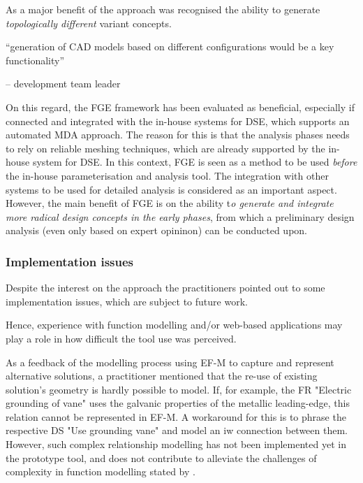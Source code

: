 \documentclass[preprints,article,accept,moreauthors,pdftex]{Definitions/mdpi}
\begin{document}
As a major benefit of the approach was recognised the ability to generate \textit{topologically different} variant concepts.

\begin{center}
    “generation of CAD models based on different configurations would be a key functionality” 
\end{center}
\begin{flushright}
    -- development team leader
\end{flushright}

On this regard, the \ac{FGE} framework has been evaluated as beneficial, especially if connected and integrated with the in-house systems for DSE, which supports an automated \ac{MDA} approach.
The reason for this is that the analysis phases needs to rely on reliable meshing techniques, which are already supported by the in-house system for DSE.
In this context, FGE is seen as a method to be used \textit{before} the in-house parameterisation and analysis tool.
The integration with other systems to be used for detailed analysis is considered as an important aspect.
However, the main benefit of FGE is on the ability t\textit{o generate and integrate more radical design concepts in the early phases}, from which a preliminary design analysis (even only based on expert opininon) can be conducted upon. 


\subsubsection{Implementation issues }

Despite the interest on the approach the practitioners pointed out to some implementation issues, which are subject to future work.

Hence, experience with function modelling and/or web-based applications may play a role in how difficult the tool use was perceived.

As a feedback of the modelling process using \ac{EF-M} to capture and represent alternative solutions, a practitioner mentioned that the re-use of existing solution's geometry is hardly possible to model.
If, for example, the \ac{FR} "Electric grounding of vane" uses the galvanic properties of the metallic leading-edge, this relation cannot be represented in \ac{EF-M}.
A workaround for this is to phrase the respective \ac{DS} "Use grounding vane" and model an \ac{iw} connection between them.
However, such complex relationship modelling has not been implemented yet in the prototype tool, and does not contribute to alleviate the challenges of complexity in function modelling stated by \cite{Muller2020, Tomiyama2013}.
\end{document}

